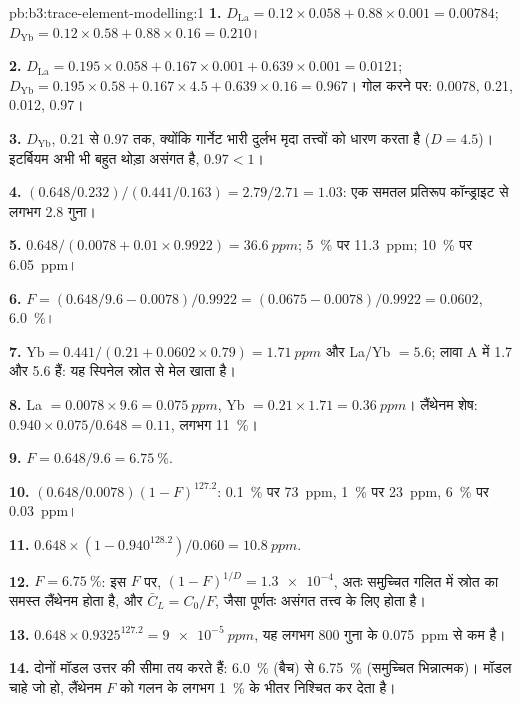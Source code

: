 \begin{solution}{pb:b3:trace-element-modelling:1}
\textbf{1.} $D_{\mathrm{La}} = 0.12\times0.058 + 0.88\times0.001 = 0.00784$;
$D_{\mathrm{Yb}} = 0.12\times0.58 + 0.88\times0.16 = 0.210$।

\textbf{2.} $D_{\mathrm{La}} = 0.195\times0.058 + 0.167\times0.001 +
0.639\times0.001 = 0.0121$; $D_{\mathrm{Yb}} = 0.195\times0.58 +
0.167\times4.5 + 0.639\times0.16 = 0.967$। गोल करने पर: 0.0078, 0.21, 0.012, 0.97।

\textbf{3.} $D_{\mathrm{Yb}}$, 0.21 से 0.97 तक, क्योंकि गार्नेट
भारी दुर्लभ मृदा तत्त्वों को धारण करता है ($D = 4.5$)। इटर्बियम अभी भी बहुत थोड़ा असंगत है,
$0.97 < 1$।

\textbf{4.} $(0.648/0.232)/(0.441/0.163) = 2.79/2.71 = 1.03$: एक समतल प्रतिरूप
कॉन्ड्राइट से लगभग 2.8 गुना।

\textbf{5.} $0.648/(0.0078 + 0.01\times0.9922) = \qty{36.6}{ppm}$;
\qty{5}{\percent} पर \qty{11.3}{ppm}; \qty{10}{\percent} पर \qty{6.05}{ppm}।

\textbf{6.} $F = (0.648/9.6 - 0.0078)/0.9922 = (0.0675 - 0.0078)/0.9922 =
0.0602$, \qty{6.0}{\percent}।

\textbf{7.} $\mathrm{Yb} = 0.441/(0.21 + 0.0602\times0.79) = \qty{1.71}{ppm}$
और La/Yb $= 5.6$; लावा A में 1.7 और 5.6 हैं: यह स्पिनेल स्रोत से मेल खाता है।

\textbf{8.} La $= 0.0078\times9.6 = \qty{0.075}{ppm}$, Yb $= 0.21\times1.71 =
\qty{0.36}{ppm}$। लैंथेनम शेष: $0.940\times0.075/0.648 = 0.11$, लगभग
\qty{11}{\percent}।

\textbf{9.} $F = 0.648/9.6 = \qty{6.75}{\percent}$.

\textbf{10.} $(0.648/0.0078)(1 - F)^{127.2}$: \qty{0.1}{\percent} पर \qty{73}{ppm},
\qty{1}{\percent} पर \qty{23}{ppm},
\qty{6}{\percent} पर \qty{0.03}{ppm}।

\textbf{11.} $0.648\times(1 - 0.940^{128.2})/0.060 = \qty{10.8}{ppm}$.

\textbf{12.} $F = \qty{6.75}{\percent}$: इस $F$ पर, $(1 - F)^{1/D} =
\num{1.3e-4}$, अतः समुच्चित गलित में स्रोत का समस्त लैंथेनम होता है, और
$\bar C_L = C_0/F$, जैसा पूर्णतः असंगत तत्त्व के लिए होता है।

\textbf{13.} $0.648\times0.9325^{127.2} = \qty{9e-5}{ppm}$, यह लगभग 800 गुना
 के \qty{0.075}{ppm} से कम है।

\textbf{14.} दोनों मॉडल उत्तर की सीमा तय करते हैं: \qty{6.0}{\percent} (बैच)
से \qty{6.75}{\percent} (समुच्चित भिन्नात्मक)। मॉडल चाहे जो हो, लैंथेनम $F$ को
गलन के लगभग \qty{1}{\percent} के भीतर निश्चित कर देता है।


\end{solution}
